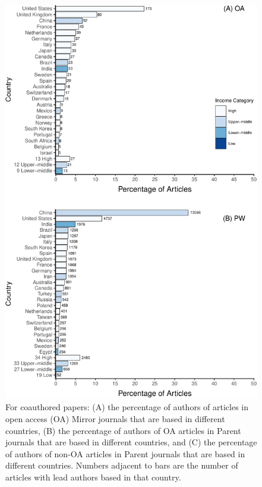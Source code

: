 \documentclass[
  english,
  man]{apa6}
\begin{document}
\begin{figure}

{\centering \includegraphics{Smith_etal_APC_ms_files/figure-latex/Fig2-1} 

}

\caption{For coauthored papers: (A) the percentage of authors of articles in open access (OA) Mirror journals that are based in different countries, (B) the percentage of authors of OA articles in Parent journals that are based in different countries, and (C) the percentage of authors of non-OA articles in Parent journals that are based in different countries. Numbers adjacent to bars are the number of articles with lead authors based in that country.}\label{fig:Fig2}
\end{figure}
\end{document}
